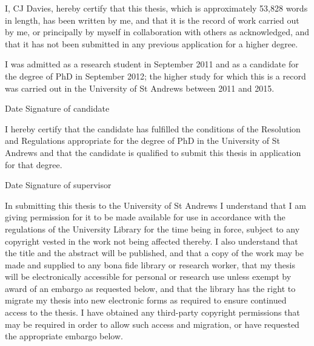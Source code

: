 

I, CJ Davies, hereby certify that this thesis, which is approximately 53,828 words in length, has been written by me, and that it is the record of work carried out by me, or principally by myself in collaboration with others as acknowledged, and that it has not been submitted in any previous application for a higher degree. 

I was admitted as a research student in September 2011 and as a candidate for the degree of PhD in September 2012; the higher study for which this is a record was carried out in the University of St Andrews between 2011 and 2015. 

\vspace{5mm}

Date \hspace{35mm} Signature of candidate

\vspace{10mm}



I hereby certify that the candidate has fulfilled the conditions of the Resolution and Regulations appropriate for the degree of PhD in the University of St Andrews and that the candidate is qualified to submit this thesis in application for that degree. 

\vspace{5mm}

Date \hspace{35mm} Signature of supervisor

\vspace{10mm}



In submitting this thesis to the University of St Andrews I understand that I am giving permission for it to be made available for use in accordance with the regulations of the University Library for the time being in force, subject to any copyright vested in the work not being affected thereby.  I also understand that the title and the abstract will be published, and that a copy of the work may be made and supplied to any bona fide library or research worker, that my thesis will be electronically accessible for personal or research use unless exempt by award of an embargo as requested below, and that the library has the right to migrate my thesis into new electronic forms as required to ensure continued access to the thesis. I have obtained any third-party copyright permissions that may be required in order to allow such access and migration, or have requested the appropriate embargo below. 

